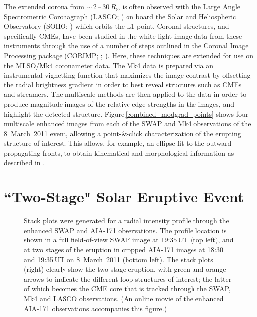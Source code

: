 \documentclass[namedreferences]{solarphysics}
\begin{document}
\begin{article}
The extended corona from $\sim$\,2\,--\,30\,$R_{\odot}$ is often observed with the Large Angle Spectrometric Coronagraph (LASCO; )  on board the Solar and Heliospheric Observatory (SOHO; ) which orbits the L1 point. Coronal structures, and specifically CMEs, have been studied in the white-light image data from these instruments through the use of a number of steps outlined in the Coronal Image Processing package (CORIMP; ; ). Here, these techniques are extended for use on the MLSO/Mk4 coronameter data. The Mk4 data is prepared via an instrumental vignetting function that maximizes the image contrast by offsetting the radial brightness gradient in order to best reveal structures such as CMEs and streamers. The multiscale methods are then applied to the data in order to produce magnitude images of the relative edge strengths in the images, and highlight the detected structure. Figure\,\ref{combined_modgrad_points} shows four multiscale enhanced images from each of the SWAP and Mk4 observations of the 8~March~2011 event, allowing a point-\&-click characterization of the erupting structure of interest. This allows, for example, an ellipse-fit to the outward propagating fronts, to obtain kinematical and morphological information as described in .



\section{``Two-Stage" Solar Eruptive Event}
\label{sect:event}

\begin{figure}[t]
\caption{Stack plots were generated for a radial intensity profile through the enhanced SWAP and AIA-171 observations. The profile location is shown in a full field-of-view SWAP image at 19:35\,UT (top left), and at two stages of the eruption in cropped AIA-171 images at 18:30 and 19:35\,UT on 8~March~2011 (bottom left). The stack plots (right) clearly show the two-stage eruption, with green and orange arrows to indicate the different loop structures of interest; the latter of which becomes the CME core that is tracked through the SWAP, Mk4 and LASCO observations. (An online movie of the enhanced AIA-171 observations accompanies this figure.)}
\label{stackplots}
\end{figure}


\end{article}
\end{document}
